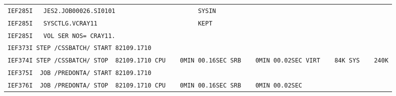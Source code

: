 \begin{tabular}{l}
\texttt{IEF285I\ \ \ JES2.JOB00026.SI0101\ \ \ \ \ \ \ \ \ \ \ \ \ \ \ \ \ \ \ \ \ \ \ SYSIN} \\
\texttt{IEF285I\ \ \ SYSCTLG.VCRAY11\ \ \ \ \ \ \ \ \ \ \ \ \ \ \ \ \ \ \ \ \ \ \ \ \ \ \ \ KEPT} \\
\texttt{IEF285I\ \ \ VOL\ SER\ NOS=\ CRAY11.} \\
\texttt{IEF373I\ STEP\ /CSSBATCH/\ START\ 82109.1710} \\
\texttt{IEF374I\ STEP\ /CSSBATCH/\ STOP\ \ 82109.1710\ CPU\ \ \ \ 0MIN\ 00.16SEC\ SRB\ \ \ \ 0MIN\ 00.02SEC\ VIRT\ \ \ \ 84K\ SYS\ \ \ \ 240K} \\
\texttt{IEF375I\ \ JOB\ /PREDONTA/\ START\ 82109.1710} \\
\texttt{IEF376I\ \ JOB\ /PREDONTA/\ STOP\ \ 82109.1710\ CPU\ \ \ \ 0MIN\ 00.16SEC\ SRB\ \ \ \ 0MIN\ 00.02SEC}
\end{tabular}

